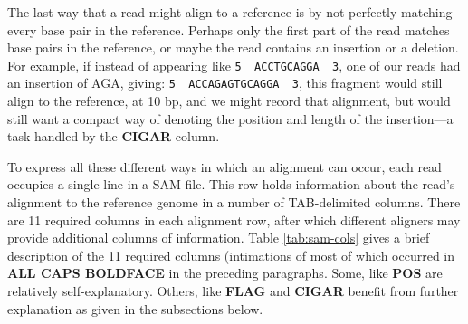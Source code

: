 \documentclass[]{krantz}
\begin{document}
The last way that a read might align to a reference is by not perfectly matching
every base pair in the reference. Perhaps only the first part of the read matches
base pairs in the reference, or maybe the read contains an insertion or a deletion.
For example, if instead of appearing like \texttt{5\textquotesingle{}\ \ ACCTGCAGGA\ \ 3\textquotesingle{}}, one of our reads
had an insertion of AGA, giving: \texttt{5\textquotesingle{}\ \ ACCAGAGTGCAGGA\ \ 3\textquotesingle{}}, this fragment would
still align to the reference, at 10 bp, and we might record that alignment,
but would still want a compact way of denoting the position and length of the
insertion---a task handled by the \textbf{CIGAR} column.

To express all these different ways in which an alignment can occur,
each read occupies a single line in a SAM file. This row holds information about
the read's alignment to the reference genome in a number of TAB-delimited columns.
There are 11 required columns in each alignment row, after which different aligners
may provide additional columns of information.
Table \ref{tab:sam-cols} gives a brief description of the 11 required columns (intimations
of most of which occurred in \textbf{ALL CAPS BOLDFACE} in the preceding paragraphs. Some,
like \textbf{POS} are relatively self-explanatory. Others, like \textbf{FLAG} and \textbf{CIGAR}
benefit from further explanation as given in the subsections below.
\end{document}
